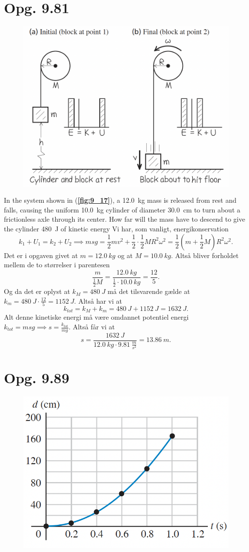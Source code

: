\documentclass[12pt]{article}
\begin{document}
\section*{Opg. 9.81}

\begin{figure} [ht]
  \centering
  \caption{}
  \includegraphics[width=0.5\linewidth]{../figures/9_17.png}
  \label{fig:9_17}
\end{figure}

In the system shown in (\textbf{\autoref{fig:9_17}}), a \qty{12,0}{kg} mass is released from rest and falls, causing the uniform \qty{10,0}{kg} cylinder of diameter \qty{30,0}{cm} to turn about a frictionless axle through its center. How far will the mass have to descend to give the cylinder \qty{480}{J} of kinetic energy
\bigbreak
Vi har, som vanligt, energikonservation
\[
k_1+U_1 = k_2 + U_2 \implies msg = \frac{1}{2}mv^2 + \frac{1}{2}\cdot \frac{1}{2}MR^2\omega^2 = \frac{1}{2}\left( m + \frac{1}{2}M \right) R^2\omega^2
.\] 
Det er i opgaven givet at $m = \qty{12,0}{kg}$ og at $M = \qty{10,0}{kg}$. Altså bliver forholdet mellem de to størrelser i parentesen
\[
\frac{m}{\frac{1}{2}M} = \frac{\qty{12,0}{kg}}{\frac{1}{2}\cdot \qty{10,0}{kg}} = \frac{12}{5}
.\] 
Og da det er oplyst at $k_M = \qty{480}{J}$ må det tilsvarende gælde at $k_m = \qty{480}{J}\cdot \frac{12}{5} = \qty{1152}{J}$. Altså har vi at
\[
k_{tot} = k_M + k_m = \qty{480}{J} + \qty{1152}{J} = \qty{1632}{J}
.\] 
Alt denne kinetiske energi må være omdannet potentiel energi $k_{tot} = msg \implies s = \frac{k_{tot}}{mg}$. Altså får vi at
\[
s = \frac{\qty{1632}{J}}{\qty{12,0}{kg}\cdot \qty{9,81}{\frac{m}{s^2}}} = \qty{13,86}{m}
.\] 

\section*{Opg. 9.89}

\begin{figure} [ht]
  \centering
  \caption{}
  \includegraphics[width=0.5\linewidth]{../figures/P9_89.png}
  \label{fig:P9_89}
\end{figure}
\end{document}
